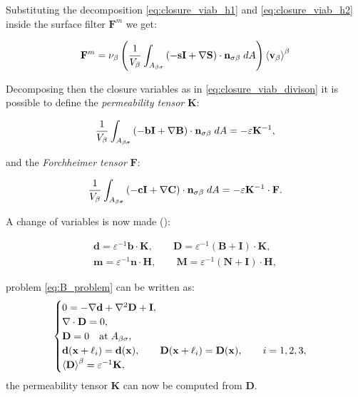 \noindent Substituting the decomposition \eqref{eq:closure_viab_h1} and \eqref{eq:closure_viab_h2} inside the surface filter $\mathbf{F}^m$ we get:

$$
\mathbf{F}^m = \nu_{\beta} \left(\dfrac{1}{V_\beta} \int_{A_{\beta \sigma}}  \left(-\mathbf{s}\mathbf{I}  +  \nabla \mathbf{S} \right) \cdot \mathbf{n}_{\sigma \beta} \;dA \right) {\left< \textbf{v}_{\beta} \right>}^{\beta}
$$

\noindent Decomposing then the closure variables as in \eqref{eq:closure_viab_divison} it is possible to define the \textit{permeability tensor} $\mathbf{K}$:

$$
 \dfrac{1}{V_\beta} \int_{A_{\beta \sigma}}  \left(-\mathbf{b}\mathbf{I}  +  \nabla \mathbf{B} \right) \cdot \mathbf{n}_{\sigma \beta} \;dA = -\varepsilon \mathbf{K}^{-1},
$$

\noindent and the \textit{Forchheimer tensor} $\mathbf{F}$:

$$
\dfrac{1}{V_\beta} \int_{A_{\beta \sigma}} \left(-\mathbf{c}\mathbf{I}  +  \nabla \mathbf{C} \right) \cdot \mathbf{n}_{\sigma \beta} \;dA = -\varepsilon \mathbf{K}^{-1} \cdot \mathbf{F}.
$$

\noindent A change of variables is now made (\citet{barrere1992closure}):


\begin{eqnarray}
	\mathbf{d} = \varepsilon^{-1} \mathbf{b} \cdot \mathbf{K}, \qquad \mathbf{D} = \varepsilon^{-1} \left(\mathbf{B} + \mathbf{I} \right)\cdot \mathbf{K}, \\
\mathbf{m} = \varepsilon^{-1} \mathbf{n} \cdot \mathbf{H}, \qquad \mathbf{M} = \varepsilon^{-1} \left(\mathbf{N} + \mathbf{I} \right)\cdot \mathbf{H}, \label{eq:barrere2}
\end{eqnarray}


\noindent problem \eqref{eq:B_problem} can be written as:
\begin{eqnarray}
	\begin{cases}
		0 = -\nabla \mathbf{d} + \nabla^2 \mathbf{D} +\mathbf{I},\\
		\nabla \cdot \mathbf{D} = 0,  \\
		\mathbf{D} = 0 \quad \textrm{at} \; A_{\beta \sigma} ,\\
		\mathbf{d}(\mathbf{x} +\ell_i) = \mathbf{d}(\mathbf{x}), \qquad \mathbf{D}(\mathbf{x} +\ell_i) = \mathbf{D}(\mathbf{x}), \qquad i=1,2,3 ,\\
		{\left< \mathbf{D} \right>}^{\beta} = \varepsilon^{-1} \mathbf{K},
	\end{cases}
\label{eq:D_problem}
\end{eqnarray}
the permeability tensor $\mathbf{K}$ can now be computed from $\mathbf{D}$.


